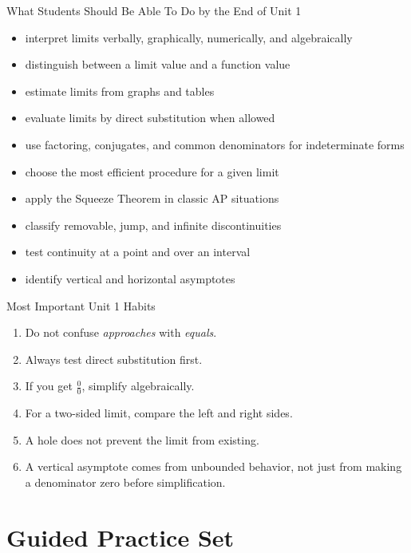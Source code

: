 \documentclass[11pt]{article}
\begin{document}
\begin{skillbox}{What Students Should Be Able To Do by the End of Unit 1}
\begin{itemize}
    \item interpret limits verbally, graphically, numerically, and algebraically
    \item distinguish between a limit value and a function value
    \item estimate limits from graphs and tables
    \item evaluate limits by direct substitution when allowed
    \item use factoring, conjugates, and common denominators for indeterminate forms
    \item choose the most efficient procedure for a given limit
    \item apply the Squeeze Theorem in classic AP situations
    \item classify removable, jump, and infinite discontinuities
    \item test continuity at a point and over an interval
    \item identify vertical and horizontal asymptotes
\end{itemize}
\end{skillbox}

\begin{notebox}{Most Important Unit 1 Habits}
\begin{enumerate}
    \item Do not confuse \emph{approaches} with \emph{equals}.
    \item Always test direct substitution first.
    \item If you get $\frac00$, simplify algebraically.
    \item For a two-sided limit, compare the left and right sides.
    \item A hole does not prevent the limit from existing.
    \item A vertical asymptote comes from unbounded behavior, not just from making a denominator zero before simplification.
\end{enumerate}
\end{notebox}

\newpage
\section*{Guided Practice Set}
\end{document}
